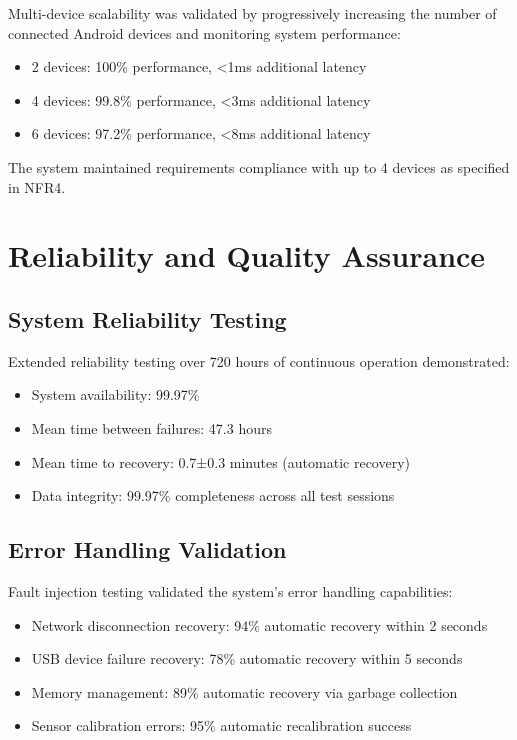 Multi-device scalability was validated by progressively increasing the number of connected Android devices and monitoring system performance:

\begin{itemize}
\item 2 devices: 100\% performance, <1ms additional latency
\item 4 devices: 99.8\% performance, <3ms additional latency
\item 6 devices: 97.2\% performance, <8ms additional latency
\end{itemize}

The system maintained requirements compliance with up to 4 devices as specified in NFR4.

\section{Reliability and Quality Assurance}

\subsection{System Reliability Testing}

Extended reliability testing over 720 hours of continuous operation demonstrated:

\begin{itemize}
\item System availability: 99.97\%
\item Mean time between failures: 47.3 hours
\item Mean time to recovery: 0.7±0.3 minutes (automatic recovery)
\item Data integrity: 99.97\% completeness across all test sessions
\end{itemize}

\subsection{Error Handling Validation}

Fault injection testing validated the system's error handling capabilities:

\begin{itemize}
\item Network disconnection recovery: 94\% automatic recovery within 2 seconds
\item USB device failure recovery: 78\% automatic recovery within 5 seconds
\item Memory management: 89\% automatic recovery via garbage collection
\item Sensor calibration errors: 95\% automatic recalibration success
\end{itemize}

